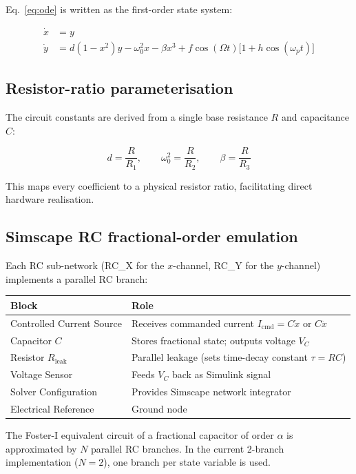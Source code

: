 \documentclass[12pt,a4paper]{article}
\begin{document}
Eq.~\eqref{eq:ode} is written as the first-order state system:

\begin{align}
  \dot{x} &= y \\
  \dot{y} &= d(1-x^2)y - \omega_0^2 x - \beta x^3 + f\cos(\Omega t)\bigl[1+h\cos(\omega_p t)\bigr]
\end{align}

\subsection{Resistor-ratio parameterisation}

The circuit constants are derived from a single base resistance $R$ and capacitance $C$:

\begin{equation}
  d = \frac{R}{R_1}, \qquad
  \omega_0^2 = \frac{R}{R_2}, \qquad
  \beta = \frac{R}{R_3}
\end{equation}

This maps every coefficient to a physical resistor ratio, facilitating direct hardware realisation.

\subsection{Simscape RC fractional-order emulation}

Each RC sub-network (RC\_X for the $x$-channel, RC\_Y for the $y$-channel) implements a parallel RC branch:

\begin{center}
\begin{tabular}{ll}
\toprule
Block & Role\\
\midrule
Controlled Current Source & Receives commanded current $I_\text{cmd} = C\dot{x}$ or $C\ddot{x}$\\
Capacitor $C$             & Stores fractional state; outputs voltage $V_C$\\
Resistor $R_\text{leak}$  & Parallel leakage (sets time-decay constant $\tau=RC$)\\
Voltage Sensor            & Feeds $V_C$ back as Simulink signal\\
Solver Configuration      & Provides Simscape network integrator\\
Electrical Reference      & Ground node\\
\bottomrule
\end{tabular}
\end{center}

The Foster-I equivalent circuit of a fractional capacitor of order $\alpha$ is approximated by $N$ parallel RC branches.  In the current 2-branch implementation ($N=2$), one branch per state variable is used.
\end{document}
